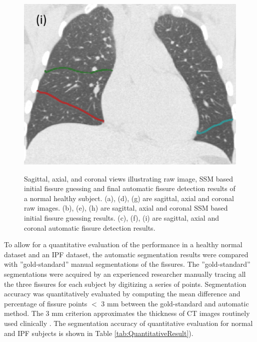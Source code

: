 \documentclass[]{spie}  %
\begin{document}
{\begin{figure}[htbp]
\begin{subfigure}
{\begin{minipage}[t]{0.2\linewidth}
  \includegraphics[width=\linewidth,trim={{.0\wd0} {.0\wd0} {.0\wd0} {.0\wd0}},clip]{Image/H1335_FRC_PCAFissureDetection_Coronal.png}
  \centerline{}
	\end{minipage}%
   }%
  \label{fig:HLASegmentationResults-i} 
\end{subfigure}
\caption{Sagittal, axial, and coronal views illustrating raw image, SSM based initial fissure guessing and final automatic fissure detection results of a normal healthy subject. (a), (d), (g) are sagittal, axial and coronal raw images. (b), (e), (h) are sagittal, axial and coronal SSM based initial fissure guessing results. (c), (f), (i) are sagittal, axial and coronal automatic fissure detection results.}
\label{fig:HLASegmentationResults}
\end{figure}

To allow for a quantitative evaluation of the performance in a healthy normal dataset and an IPF dataset, the automatic segmentation results were compared with ''gold-standard'' manual segmentations of the fissures. The ''gold-standard'' segmentations were acquired by an experienced researcher manually tracing all the three fissures for each subject by digitizing a series of points. Segmentation accuracy was quantitatively evaluated by computing the mean difference and percentage of fissure points $<$ 3 mm between the gold-standard and automatic method. The 3 mm criterion approximates the thickness of CT images routinely used clinically \cite{wei2009segmentation}. The segmentation accuracy of quantitative evaluation for normal and IPF subjects is shown in Table \ref{tab:QuantitativeResult}).

}
\end{document}
